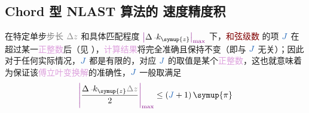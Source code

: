 \subsection{Chord 型 NLAST 算法的 速度精度积}\label{ssec:NLAST_speed_accuracy_product}

在特定单步\textcolor{gray}{步长} $\mathcolor{gray}{\Delta z}$ 和具体\textcolor{PineGreen}{匹配}程度 $\textcolor{Plum}{\left|\textcolor{black}{\Delta \xint{\begin{smallmatrix} ~ \\ {}^{}_{\mathcolor{gray}{-}} \\ ~ \end{smallmatrix}}{15}{k}_{\symup{z}}}\right|_{\max}}$ 下，\textcolor{Maroon}{和弦级数}  的\textcolor{NavyBlue}{项} $\textcolor{NavyBlue}{J}$ 在超过某一\textcolor{Plum}{正整数}后（见 ），\textcolor{Plum}{计算结果}将完全准确且保持不变（即与 $\textcolor{NavyBlue}{J}$ 无关）；因此对于任何实际情况，$\textcolor{NavyBlue}{J}$ 都是有限的，对应 $\textcolor{NavyBlue}{J}$ 的取值是某个\textcolor{Plum}{正整数}，这也就意味着为保证该\textcolor{Plum}{傅立叶变换解}的准确性，$\textcolor{NavyBlue}{J}$ 一般取满足
\begin{align} \label{eq:Chord-accuracy-J-condition}
	\textcolor{Plum}{\left| \textcolor{black}{\frac{ \Delta \xint{\begin{smallmatrix} ~ \\ {}^{}_{\mathcolor{gray}{-}} \\ ~ \end{smallmatrix}}{15}{k}_{\symup{z}} \mathcolor{gray}{\Delta z} }{ 2 }}  \right|_{\max}} \leq \left( \textcolor{NavyBlue}{J}+1 \right) \symup{\pi}
\end{align}

